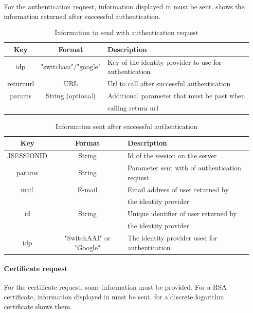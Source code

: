 \documentclass[oneside]{scrreprt}
\begin{document}
For the authentication request, information displayed in  must be sent.  shows the information returned after successful authentication.

\begin{table}[ht]
\centering
\begin{tabular}{|c|c|l|}
  \hline
  Key & Format & Description\\
  \hline
  idp & "switchaai"/"google" & Key of the identity provider to use for authentication\\
  returnurl & URL & Url to call after successful authentication\\
  params & String (optional) & Additional parameter that must be past when\\ & & calling return url\\
  \hline
\end{tabular}
\caption{Information to send with authentication request}
\label{t:authreq}
\end{table}

\begin{table}[ht]
\centering
\begin{tabular}{|c|c|l|}
  \hline
  Key & Format & Description\\
  \hline
  JSESSIONID & String & Id of the session on the server\\
  params & String & Parameter sent with of authentication request \\
  mail & E-mail & Email address of user returned by\\ & & the identity provider\\
  id & String & Unique identifier of user returned by\\ & & the identity provider\\
  idp & "SwitchAAI" or "Google" & The identity provider used for authentication\\
  \hline
\end{tabular}
\caption{Information sent after successful authentication}
\label{t:authresp}
\end{table}

\paragraph*{Certificate request}

For the certificate request, some information must be provided. For a RSA certificate, information displayed in  must be sent, for a discrete logarithm certificate  shows them.
\end{document}
